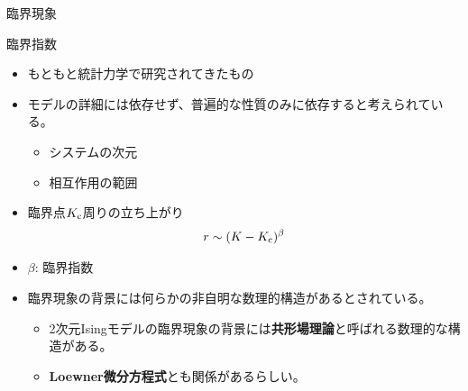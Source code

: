 \begin{frame}{臨界現象}
  \begin{block}{臨界指数}
  \begin{itemize}
  \item もともと統計力学で研究されてきたもの
  \item モデルの詳細には依存せず、普遍的な性質のみに依存すると考えられている。
  \begin{itemize}
    \item システムの次元
    \item 相互作用の範囲
  \end{itemize}
  \end{itemize}
  \end{block}
  \begin{itemize}
    \item 臨界点$K_{\mathrm{c}}$周りの立ち上がり
    \begin{align*}
      r\sim(K-K_{\mathrm{c}})^{\beta}
    \end{align*}
    \item $\beta$: 臨界指数
   \item 臨界現象の背景には何らかの非自明な数理的構造があるとされている。
   \begin{itemize}
     \item 2次元Isingモデルの臨界現象の背景には\textbf{共形場理論}と呼ばれる数理的な構造がある。
     \item \textbf{Loewner微分方程式}とも関係があるらしい。
   \end{itemize}
  \end{itemize}
\end{frame}